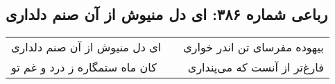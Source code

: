 \begin{center}
\section*{رباعی شماره ۳۸۶: ای دل منیوش از آن صنم دلداری}
\label{sec:sh386}
\begin{longtable}{l p{0.5cm} r}
ای دل منیوش از آن صنم دلداری
&&
بیهوده مفرسای تن اندر خواری
\\
کان ماه ستمگاره ز درد و غم تو
&&
فارغ‌تر از آنست که می‌پنداری
\\
\end{longtable}
\end{center}

